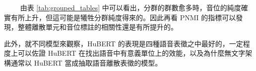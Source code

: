 　　
由表 \ref{tab:grouped_tables} 中可以看出，分群的群數愈多時，音位的純度確實有所上升，但這可能是犧牲分群純度得來的。因此再看 PNMI 的指標可以發現，整體離散單元和音位標註的相關性還是有所提升的。

此外，就不同模型來觀察，HuBERT 的表現是四種語音表徵之中最好的，一定程度上可以佐證 HuBERT 在找出語音中有意義單位上的效能，以及為什麼無文字架構通常以 HuBERT 當成抽取語音離散表徵的模型。













